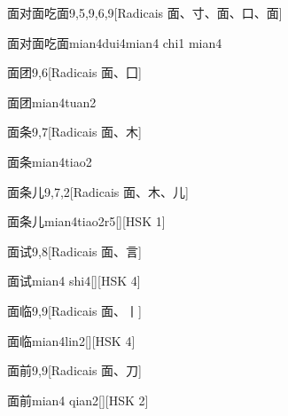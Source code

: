\begin{entry}{面对面吃面}{9,5,9,6,9}[Radicais ⾯、⼨、⾯、⼝、⾯]
  \begin{phonetics}{面对面吃面}{mian4dui4mian4 chi1 mian4}
  \end{phonetics}
\end{entry}

\begin{entry}{面团}{9,6}[Radicais ⾯、⼞]
  \begin{phonetics}{面团}{mian4tuan2}
  \end{phonetics}
\end{entry}

\begin{entry}{面条}{9,7}[Radicais ⾯、⽊]
  \begin{phonetics}{面条}{mian4tiao2}
  \end{phonetics}
\end{entry}

\begin{entry}{面条儿}{9,7,2}[Radicais ⾯、⽊、⼉]
  \begin{phonetics}{面条儿}{mian4tiao2r5}[][HSK 1]
  \end{phonetics}
\end{entry}

\begin{entry}{面试}{9,8}[Radicais ⾯、⾔]
  \begin{phonetics}{面试}{mian4 shi4}[][HSK 4]
  \end{phonetics}
\end{entry}

\begin{entry}{面临}{9,9}[Radicais ⾯、⼁]
  \begin{phonetics}{面临}{mian4lin2}[][HSK 4]
  \end{phonetics}
\end{entry}

\begin{entry}{面前}{9,9}[Radicais ⾯、⼑]
  \begin{phonetics}{面前}{mian4 qian2}[][HSK 2]
  \end{phonetics}
\end{entry}

